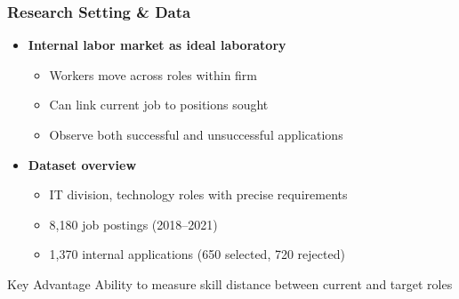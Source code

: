 \documentclass[aspectratio=169]{beamer}
\begin{document}
\begin{frame}
\frametitle{Research Setting \& Data}

\begin{itemize}
\item \textbf{Internal labor market as ideal laboratory}
  \begin{itemize}
  \item Workers move across roles within firm
  \item Can link current job to positions sought
  \item Observe both successful and unsuccessful applications
  \end{itemize}
\vspace{0.8em}

\item \textbf{Dataset overview}
  \begin{itemize}
  \item IT division, technology roles with precise requirements
  \item 8,180 job postings (2018–2021)
  \item 1,370 internal applications (650 selected, 720 rejected)
  \end{itemize}
\end{itemize}

\begin{block}{Key Advantage}
Ability to measure skill distance between current and target roles
\end{block}
\end{frame}
\end{document}
